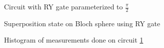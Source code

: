\begin{figure}[!h]
    \centering
    \caption{Circuit with RY gate parameterized to $\frac{\pi}{2}$}
    \label{fig:circuit_ry}
\end{figure}

\begin{figure}[!h]
    \centering
    \caption{Superposition state on Bloch sphere using RY gate}
    \label{fig:ry_bloch_sphere}
\end{figure}

\begin{figure}[!h]
    \centering
    \caption{Histogram of measurements done on circuit \ref{fig:circuit_ry}}
    \label{fig:histogram_ry}
\end{figure}

